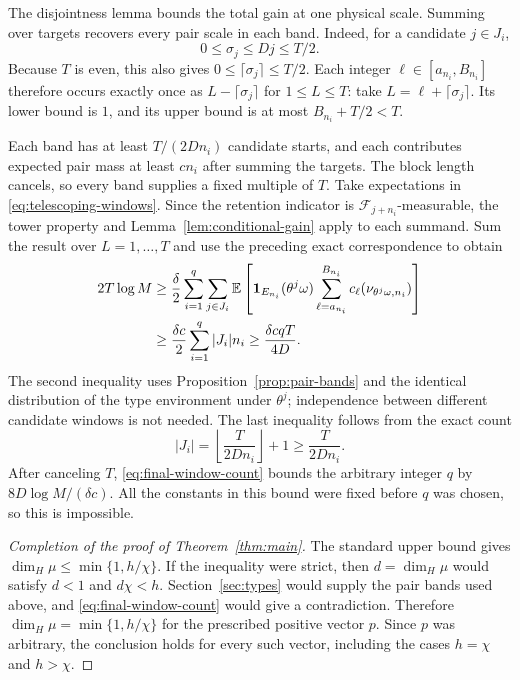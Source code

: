 The disjointness lemma bounds the total gain at one physical scale.
Summing over targets recovers every pair scale in each band.  Indeed,
for a candidate $j\in J_i$,
\[
 0\le\sigma_j\le Dj\le T/2.
\]
Because $T$ is even, this also gives
$0\le\lceil\sigma_j\rceil\le T/2$.  Each integer
$\ell\in[a_{n_i},B_{n_i}]$ therefore occurs exactly once as
$L-\lceil\sigma_j\rceil$ for $1\le L\le T$: take
$L=\ell+\lceil\sigma_j\rceil$.  Its lower bound is $1$, and its
upper bound is at most $B_{n_i}+T/2<T$.

Each band has at least $T/(2Dn_i)$ candidate starts, and each contributes
expected pair mass at least $cn_i$ after summing the targets.  The block
length cancels, so every band supplies a fixed multiple of $T$.
Take expectations in \eqref{eq:telescoping-windows}.  Since the retention
indicator is $\mathcal F_{j+n_i}$-measurable, the tower property and
Lemma~\ref{lem:conditional-gain} apply to each summand.  Sum the result
over $L=1,\ldots,T$ and use the preceding exact correspondence to obtain
\begin{align}
 2T\log M
 &\ge\frac\delta2\sum_{i=1}^q\sum_{j\in J_i}
 \mathbb E\left[
 \mathbf1_{E_{n_i}}(\theta^j\omega)
 \sum_{\ell=a_{n_i}}^{B_{n_i}}
 c_\ell(\nu_{\theta^j\omega,n_i})\right]
 \notag\\
 &\ge\frac{\delta c}{2}\sum_{i=1}^q |J_i|n_i
 \ge\frac{\delta c qT}{4D}.
 \label{eq:final-window-count}
\end{align}
The second inequality uses Proposition~\ref{prop:pair-bands} and the
identical distribution of the type environment under $\theta^j$;
independence between different candidate windows is not needed.  The
last inequality follows from the exact count
\[
 |J_i|=\left\lfloor\frac{T}{2Dn_i}\right\rfloor+1
 \ge\frac{T}{2Dn_i}.
\]
After canceling $T$, \eqref{eq:final-window-count} bounds the arbitrary
integer $q$ by $8D\log M/(\delta c)$.  All the constants in this bound
were fixed before $q$ was chosen, so this is impossible.

\begin{proof}[Completion of the proof of Theorem~\ref{thm:main}]
The standard upper bound gives
$\dim_H\mu\le\min\{1,h/\chi\}$.  If the inequality were strict,
then $d=\dim_H\mu$ would satisfy $d<1$ and $d\chi<h$.
Section~\ref{sec:types} would supply the pair bands used above, and
\eqref{eq:final-window-count} would give a contradiction.  Therefore
$\dim_H\mu=\min\{1,h/\chi\}$ for the prescribed positive vector
$p$.  Since $p$ was arbitrary, the conclusion holds for every such
vector, including the cases $h=\chi$ and $h>\chi$.
\end{proof}
